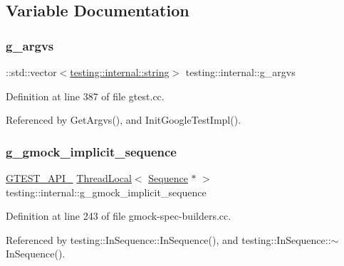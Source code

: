 \subsection{Variable Documentation}
\mbox{\label{namespacetesting_1_1internal_ab7fe90df4f87f1bd8a244b0be2ccad79}} 
\subsubsection{\texorpdfstring{g\+\_\+argvs}{g\_argvs}}
{\footnotesize\ttfamily \+::std\+::vector$<$\hyperlink{namespacetesting_1_1internal_a8e8ff5b11e64078831112677156cb111}{testing\+::internal\+::string}$>$ testing\+::internal\+::g\+\_\+argvs}



Definition at line 387 of file gtest.\+cc.



Referenced by Get\+Argvs(), and Init\+Google\+Test\+Impl().

\mbox{\label{namespacetesting_1_1internal_af4407fe8aeb1e43b2f58940736a20590}} 
\subsubsection{\texorpdfstring{g\+\_\+gmock\+\_\+implicit\+\_\+sequence}{g\_gmock\_implicit\_sequence}}
{\footnotesize\ttfamily \hyperlink{gtest-port_8h_aa73be6f0ba4a7456180a94904ce17790}{G\+T\+E\+S\+T\+\_\+\+A\+P\+I\+\_\+} \hyperlink{classtesting_1_1internal_1_1ThreadLocal}{Thread\+Local}$<$ \hyperlink{classtesting_1_1Sequence}{Sequence} $\ast$ $>$ testing\+::internal\+::g\+\_\+gmock\+\_\+implicit\+\_\+sequence}



Definition at line 243 of file gmock-\/spec-\/builders.\+cc.



Referenced by testing\+::\+In\+Sequence\+::\+In\+Sequence(), and testing\+::\+In\+Sequence\+::$\sim$\+In\+Sequence().

